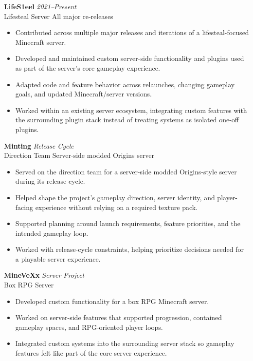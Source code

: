 \documentclass[10pt,letterpaper]{article}
\newcommand{\role}[4]{
  \textbf{#1} \hfill \textit{#2}\\
  \textcolor{textgray}{#3} \hfill \textcolor{textgray}{#4}
  \vspace{2pt}
}
\begin{document}
\role{LifeS1eel}{2021--Present}{Lifesteal Server}{All major re-releases}

\begin{itemize}
  \item Contributed across multiple major releases and iterations of a
        lifesteal-focused Minecraft server.
  \item Developed and maintained custom server-side functionality and plugins
        used as part of the server's core gameplay experience.
  \item Adapted code and feature behavior across relaunches, changing gameplay
        goals, and updated Minecraft/server versions.
  \item Worked within an existing server ecosystem, integrating custom features
        with the surrounding plugin stack instead of treating systems as
        isolated one-off plugins.
\end{itemize}

\role{Minting}{Release Cycle}{Direction Team}{Server-side modded Origins server}

\begin{itemize}
  \item Served on the direction team for a server-side modded Origins-style
        server during its release cycle.
  \item Helped shape the project's gameplay direction, server identity, and
        player-facing experience without relying on a required texture pack.
  \item Supported planning around launch requirements, feature priorities, and
        the intended gameplay loop.
  \item Worked with release-cycle constraints, helping prioritize decisions
        needed for a playable server experience.
\end{itemize}

\role{MineVeXx}{Server Project}{Box RPG Server}{}

\begin{itemize}
  \item Developed custom functionality for a box RPG Minecraft server.
  \item Worked on server-side features that supported progression, contained
        gameplay spaces, and RPG-oriented player loops.
  \item Integrated custom systems into the surrounding server stack so gameplay
        features felt like part of the core server experience.
\end{itemize}
\end{document}
